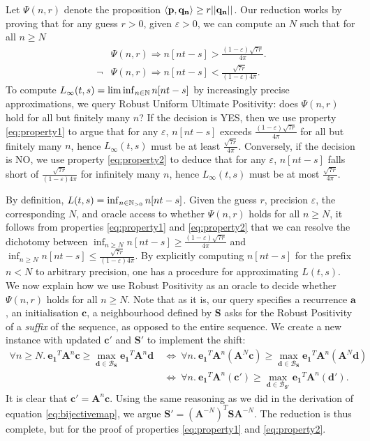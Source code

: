 Let $\Psi(n, r)$ denote the proposition $ \langle\mathbf{p}, \mathbf{q_n}\rangle \ge r||\mathbf{q_n}||$. Our reduction works by proving that for any guess $r>0$, given $\varepsilon>0$, we can compute an $N$ such that for all $n \ge N$
\begin{align}
\label{eq:property1}
&\Psi(n, r) \Rightarrow n[nt - s] > \frac{(1-\varepsilon)\sqrt{7r}}{4\pi}. \\
\label{eq:property2}
\neg &\Psi(n, r) \Rightarrow n[nt - s] < \frac{\sqrt{7r}}{(1-\varepsilon)4\pi}.
\end{align}
To compute $L_\infty(t, s) = \liminf_{n \in \mathbb{N}} n[nt-s]$ by increasingly precise approximations, we query Robust Uniform Ultimate Positivity: does $\Psi(n,r)$ hold for all but finitely many $n$? If the decision is YES, then we use property \ref{eq:property1} to argue that for any $\varepsilon$, $n[nt-s]$ exceeds $\frac{(1-\varepsilon)\sqrt{7r}}{4\pi}$ for all but finitely many $n$, hence $L_\infty(t, s)$ must be at least $\frac{\sqrt{7r}}{4\pi}$. Conversely, if the decision is NO, we use property \ref{eq:property2} to deduce that for any $\varepsilon$, $n[nt-s]$ falls short of $\frac{\sqrt{7r}}{(1-\varepsilon)4\pi}$ for infinitely many $n$, hence $L_\infty(t, s)$ must be at most $\frac{\sqrt{7r}}{4\pi}$.

By definition, $L(t,s) = \inf_{n\in\mathbb{N}_{>0}}n[nt-s]$. Given the guess $r$, precision $\varepsilon$, the corresponding $N$, and oracle access to whether $\Psi(n, r)$ holds for all $n \ge N$, it follows from properties \ref{eq:property1} and \ref{eq:property2} that we can resolve the dichotomy between $\inf_{n \ge N}n[nt-s] \ge \frac{(1-\varepsilon)\sqrt{7r}}{4\pi}$ and $\inf_{n \ge N}n[nt-s] \le \frac{\sqrt{7r}}{(1-\varepsilon)4\pi}$. By explicitly computing $n[nt-s]$ for the prefix $n < N$ to arbitrary precision, one has a procedure for approximating $L(t, s)$. We now explain how we use Robust Positivity as an oracle to decide whether $\Psi(n, r)$ holds for all $n \ge N$. Note that as it is, our query specifies a recurrence $\mathbf{a}$, an initialisation $\mathbf{c}$, a neighbourhood defined by $\mathbf{S}$ asks for the Robust Positivity of a \textit{suffix} of the sequence, as opposed to the entire sequence. We create a new instance with updated $\mathbf{c'}$ and $\mathbf{S'}$ to implement the shift:
\begin{align}
\forall n\ge N.~ \mathbf{e_1}^T\mathbf{A}^n\mathbf{c} \ge \max_{\mathbf{d} \in \mathcal{B}_\mathbf{S}}\mathbf{e_1}^T\mathbf{A}^n\mathbf{d} ~&\Leftrightarrow~ \forall n.~ \mathbf{e_1}^T\mathbf{A}^n(\mathbf{A}^N\mathbf{c}) \ge \max_{\mathbf{d} \in \mathcal{B}_\mathbf{S}}\mathbf{e_1}^T\mathbf{A}^n(\mathbf{A}^N\mathbf{d}) \\
&\Leftrightarrow~ \forall n.~ \mathbf{e_1}^T\mathbf{A}^n(\mathbf{c'}) \ge \max_{\mathbf{d} \in \mathcal{B}_\mathbf{S'}}\mathbf{e_1}^T\mathbf{A}^n(\mathbf{d'}).
\end{align}
It is clear that $\mathbf{c'} = \mathbf{A}^n\mathbf{c}$. Using the same reasoning as we did in the derivation of equation \ref{eq:bijectivemap}, we argue $\mathbf{S'} = (\mathbf{A}^{-N})^T\mathbf{S}\mathbf{A}^{-N}$. The reduction is thus complete, but for the proof of properties \ref{eq:property1} and \ref{eq:property2}.

